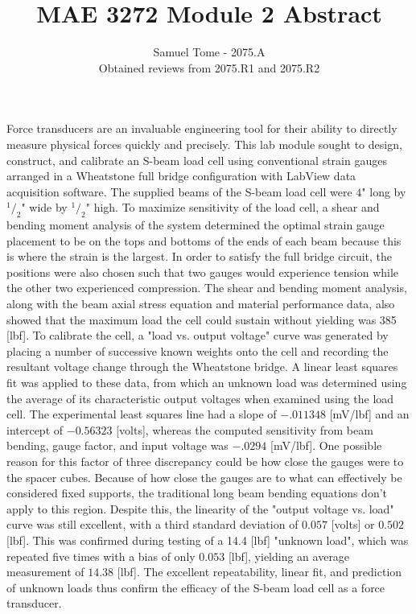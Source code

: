 \documentclass[11pt]{article}
\begin{document}
 

 
\title{MAE 3272 Module 2 Abstract}
\author{Samuel Tome - 2075.A \\ Obtained reviews from 2075.R1 and 2075.R2}
\maketitle



Force transducers are an invaluable engineering tool for their ability to directly measure physical forces quickly and precisely.  This lab module sought to design, construct, and calibrate an S-beam load cell using conventional strain gauges arranged in a Wheatstone full bridge configuration with LabView data acquisition software.  The supplied beams of the S-beam load cell were $4$" long by $^1/_2$" wide by $^1/_2$" high.  To maximize sensitivity of the load cell, a shear and bending moment analysis of the system determined the optimal strain gauge placement to be on the tops and bottoms of the ends of each beam because this is where the strain is the largest.  In order to satisfy the full bridge circuit, the positions were also chosen such that two gauges would experience tension while the other two experienced compression.  The shear and bending moment analysis, along with the beam axial stress equation and material performance data, also showed that the maximum load the cell could sustain without yielding was 385 [lbf].  To calibrate the cell, a "load vs. output voltage" curve was generated by placing a number of successive known weights onto the cell and recording the resultant voltage change through the Wheatstone bridge.  A linear least squares fit was applied to these data, from which an unknown load was determined using the average of its characteristic output voltages when examined using the load cell.  The experimental least squares line had a slope of $-.011348 $ [mV/lbf] and an intercept of $-0.56323$ [volts], whereas the computed sensitivity from beam bending, gauge factor, and input voltage was $ -.0294 $ [mV/lbf].  One possible reason for this factor of three discrepancy could be how close the gauges were to the spacer cubes.  Because of how close the gauges are to what can effectively be considered fixed supports, the traditional long beam bending equations don't apply to this region.  Despite this, the linearity of the "output voltage vs. load" curve was still excellent, with a third standard deviation of $0.057$ [volts] or $0.502$ [lbf].  This was confirmed during testing of a 14.4 [lbf] "unknown load", which was repeated five times with a bias of only $0.053$ [lbf], yielding an average measurement of $14.38$ [lbf].  The excellent repeatability, linear fit, and prediction of unknown loads thus confirm the efficacy of the S-beam load cell as a force transducer.
\end{document}
